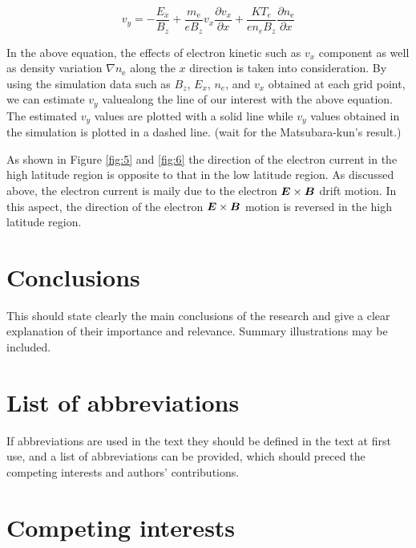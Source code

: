 \documentclass{EPS}
\newcommand{\bvec}[1]{\mbox{\boldmath $#1$}}
\begin{document}
\begin{linenomath}
 \begin{equation}
  v_{y} = 
   -\frac{E_x}{B_z} + \frac {m_\mathrm{e}}{eB_z}v_x\frac{\partial v_x}{\partial x}
   +\frac{KT_e}{en_e B_z} \frac{\partial n_\mathrm{e}} {\partial x}
 \end{equation}
\end{linenomath}

In the above equation, 
the effects of electron kinetic such as $v_x$ component as well as 
density variation $\nabla n_\mathrm{e}$ along the $x$ direction is taken into consideration. 
By using the simulation data such as $B_z$, $E_x$, $n_e$, and $v_x$ obtained at each grid point, 
we can estimate $v_y$ valuealong the line of our interest with the above equation. 
The estimated $v_y$ values are plotted with a solid line while $v_y$ values obtained in the simulation 
is plotted in a dashed line.  (wait for the Matsubara-kun's result.)


As shown in Figure \ref{fig:5} and \ref{fig:6} 
the direction of the electron current in the high latitude region 
is opposite to that in the low latitude region.
As discussed above, the electron current is maily due to the electron $\bvec{E} \times \bvec{B}$ 
drift motion. In this aspect, the direction of the electron $\bvec{E} \times \bvec{B}$ motion is 
reversed in the high latitude region.






\section{Conclusions}

This should state clearly the main conclusions of the research
and give a clear explanation of their importance and relevance.
Summary illustrations may be included.

\section{List of abbreviations}

If abbreviations are used in the text
they should be defined in the text at first use,
and a list of abbreviations can be provided,
which should preced the competing interests and authors' contributions.

\section{Competing interests}
\end{document}

